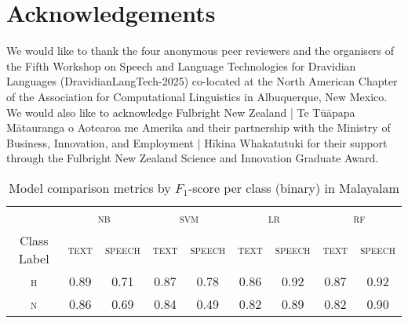 \documentclass[11pt]{article}
\begin{document}
\section*{Acknowledgements}

    We would like to thank the four anonymous peer reviewers and the organisers of the Fifth Workshop on Speech and Language Technologies for Dravidian Languages (DravidianLangTech-2025) co-located at the North American Chapter of the Association for Computational Linguistics in Albuquerque, New Mexico. We would also like to acknowledge Fulbright New Zealand | Te Tūāpapa Mātauranga o Aotearoa me Amerika and their partnership with the Ministry of Business, Innovation, and Employment | Hīkina Whakatutuki for their support through the Fulbright New Zealand Science and Innovation Graduate Award.



\appendix

    \begin{table*}[]
        \caption{\label{tab:binary_malayalam} Model comparison metrics by $F_1$-score per class (binary) in Malayalam}
        \centering
        \begin{tabular}{ccccccccc}
            \hline
            \multicolumn{1}{c}{} & \multicolumn{2}{c}{\textsc{nb}} & \multicolumn{2}{c}{\textsc{svm}} & \multicolumn{2}{c}{\textsc{lr}} & \multicolumn{2}{c}{\textsc{rf}} \\
            Class Label & \textsc{text} & \textsc{speech} & \textsc{text} & \textsc{speech} & \textsc{text} & \textsc{speech} & \textsc{text} & \textsc{speech}  \\
            \hline
            \textsc{h} & 0.89 & 0.71 & 0.87 & 0.78 & 0.86 & 0.92 & 0.87 & 0.92 \\
            \textsc{n} & 0.86 & 0.69 & 0.84 & 0.49 & 0.82 & 0.89 & 0.82 & 0.90 \\
            \hline
         \end{tabular}
     \end{table*}
\end{document}
